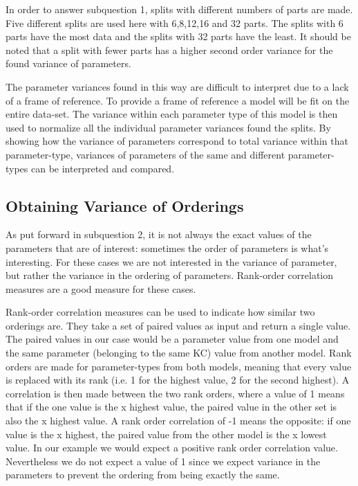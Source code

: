 \documentclass{scrartcl}
\begin{document}
In order to answer subquestion 1, splits with different numbers of parts are made. Five different splits are used here with 6,8,12,16 and 32 parts. The splits with 6 parts have the most data and the splits with 32 parts have the least. It should be noted that a split with fewer parts has a higher second order variance for the found variance of parameters.

The parameter variances found in this way are difficult to interpret due to a lack of a frame of reference. To provide a frame of reference a model will be fit on the entire data-set. The variance within each parameter type of this model is then used to normalize all the individual parameter variances found the splits. By showing how the variance of parameters correspond to total variance within that parameter-type, variances of parameters of the same and different parameter-types can be interpreted and compared.


\subsection{Obtaining Variance of Orderings}
As put forward in subquestion 2, it is not always the exact values of the parameters that are of interest: sometimes the order of parameters is what's interesting. For these cases we are not interested in the variance of parameter, but rather the variance in the ordering of parameters. Rank-order correlation measures are a good measure for these cases.

Rank-order correlation measures can be used to indicate how similar two orderings are. They take a set of paired values as input and return a single value. The paired values in our case would be a parameter value from one model and the same parameter (belonging to the same KC) value from another model. Rank orders are made for parameter-types from both models, meaning that every value is replaced with its rank (i.e. 1 for the highest value, 2 for the second highest). A correlation is then made between the two rank orders, where a value of 1 means that if the one value is the x highest value, the paired value in the other set is also the x highest value. A rank order correlation of -1 means the opposite: if one value is the x highest, the paired value from the other model is the x lowest value. In our example we would expect a positive rank order correlation value. Nevertheless we do not expect a value of 1 since we expect variance in the parameters to prevent the ordering from being exactly the same. 
\end{document}
